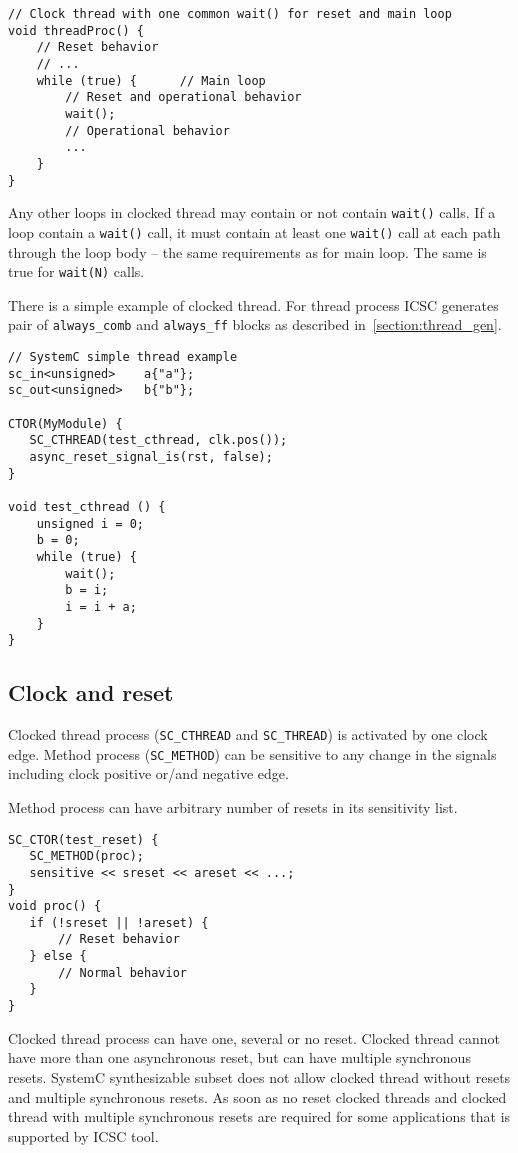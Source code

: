 \begin{lstlisting}[style=mycpp]
// Clock thread with one common wait() for reset and main loop
void threadProc() {
    // Reset behavior
    // ...
    while (true) {      // Main loop
        // Reset and operational behavior
        wait();
        // Operational behavior
        ...
    }
}
\end{lstlisting}

Any other loops in clocked thread may contain or not contain {\tt wait()} calls. If a loop contain a {\tt wait()} call, it must contain at least one {\tt wait()} call at each path through the loop body -- the same requirements as for main loop.
The same is true for {\tt wait(N)} calls.

There is a simple example of clocked thread. For thread process ICSC generates pair of {\tt always\_comb} and {\tt always\_ff} blocks as described in~\ref{section:thread_gen}.

\begin{lstlisting}[style=mycpp]
// SystemC simple thread example
sc_in<unsigned>    a{"a"};
sc_out<unsigned>   b{"b"};
 
CTOR(MyModule) {
   SC_CTHREAD(test_cthread, clk.pos());
   async_reset_signal_is(rst, false);
}
 
void test_cthread () {
    unsigned i = 0;
    b = 0;
    while (true) {
        wait();
        b = i;
        i = i + a;
    }
}
\end{lstlisting}

\subsection{Clock and reset}

Clocked thread process ({\tt SC\_CTHREAD} and {\tt SC\_THREAD}) is activated by one clock edge. Method process ({\tt SC\_METHOD}) can be sensitive to any change in the signals including clock positive or/and negative edge.

Method process can have arbitrary number of resets in its sensitivity list. 
\begin{lstlisting}[style=mycpp]
SC_CTOR(test_reset) {
   SC_METHOD(proc);
   sensitive << sreset << areset << ...;       
}
void proc() {
   if (!sreset || !areset) {
       // Reset behavior
   } else {
       // Normal behavior
   }
}
\end{lstlisting}

Clocked thread process can have one, several or no reset. Clocked thread cannot have more than one asynchronous reset, but can have multiple synchronous resets. SystemC synthesizable subset does not allow clocked thread without resets and multiple synchronous resets. As soon as no reset clocked threads and clocked thread with multiple synchronous resets are required for some applications that is supported by ICSC tool. 

